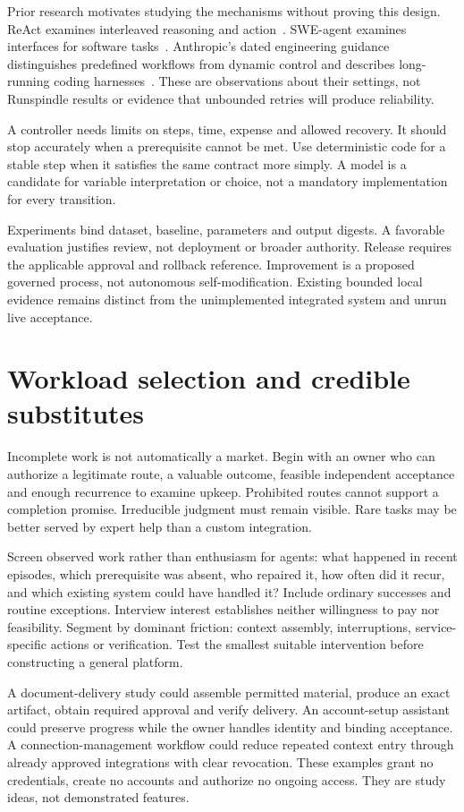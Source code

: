 \documentclass[11pt,letterpaper]{article}
\begin{document}
Prior research motivates studying the mechanisms without proving this design.
ReAct examines interleaved reasoning and action~\cite{react}. SWE-agent examines
interfaces for software tasks~\cite{sweagent}. Anthropic's dated engineering
guidance distinguishes predefined workflows from dynamic control and describes
long-running coding harnesses~\cite{anthropiceffective,anthropiclong}. These are
observations about their settings, not Runspindle results or evidence that
unbounded retries will produce reliability.

A controller needs limits on steps, time, expense and allowed recovery. It should
stop accurately when a prerequisite cannot be met. Use deterministic code for a
stable step when it satisfies the same contract more simply. A model is a
candidate for variable interpretation or choice, not a mandatory implementation
for every transition.

Experiments bind dataset, baseline, parameters and output digests. A favorable
evaluation justifies review, not deployment or broader authority. Release requires
the applicable approval and rollback reference. Improvement is a proposed governed
process, not autonomous self-modification. Existing bounded local evidence remains
distinct from the unimplemented integrated system and unrun live acceptance.

\section{Workload selection and credible substitutes}
\label{sec:markets}
Incomplete work is not automatically a market. Begin with an owner who can
authorize a legitimate route, a valuable outcome, feasible independent acceptance
and enough recurrence to examine upkeep. Prohibited routes cannot support a
completion promise. Irreducible judgment must remain visible. Rare tasks may be
better served by expert help than a custom integration.

Screen observed work rather than enthusiasm for agents: what happened in recent
episodes, which prerequisite was absent, who repaired it, how often did it recur,
and which existing system could have handled it? Include ordinary successes and
routine exceptions. Interview interest establishes neither willingness to pay
nor feasibility. Segment by dominant friction: context assembly, interruptions,
service-specific actions or verification. Test the smallest suitable intervention
before constructing a general platform.

A document-delivery study could assemble permitted material, produce an exact
artifact, obtain required approval and verify delivery. An account-setup assistant
could preserve progress while the owner handles identity and binding acceptance.
A connection-management workflow could reduce repeated context entry through
already approved integrations with clear revocation. These examples grant no
credentials, create no accounts and authorize no ongoing access. They are study
ideas, not demonstrated features.
\end{document}
